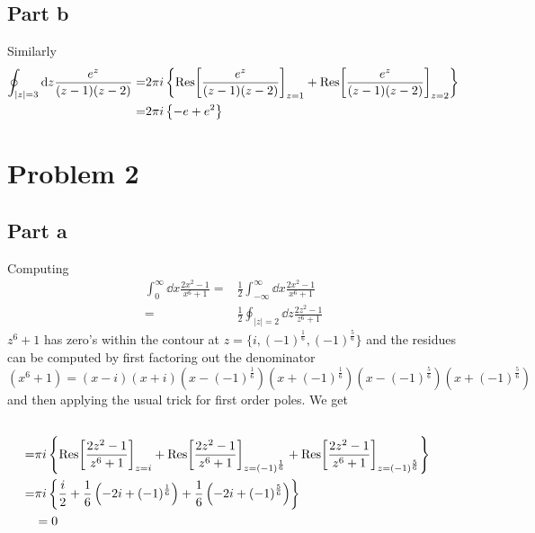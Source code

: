 \documentclass[a4paper,12pt]{article}
\begin{document}
\subsection*{Part b}
Similarly
\begin{equation}
	\begin{aligned}
		\oint_{|z|=3} \dd z\frac{e^z}{(z-1)(z-2)}=&2\pi i \left\{\Res[\frac{e^z}{(z-1)(z-2)}]_{z=1}+\Res[\frac{e^z}{(z-1)(z-2)}]_{z=2}\right\}\\
		=&2\pi i \left\{-e+e^2\right\}\\
	\end{aligned}
\end{equation}
\section*{Problem 2}
\subsection*{Part a}
Computing
\begin{equation}
	\begin{aligned}
		\int_{0}^{\infty}\dd x\frac{2x^2-1}{x^6+1}
		=&	\frac{1}{2}\int_{-\infty}^{\infty}\dd x\frac{2x^2-1}{x^6+1}
		\\
		=&\frac{1}{2}\oint_{|z|=2} \dd z\frac{2z^2-1}{z^6+1}
	\end{aligned}
\end{equation}
$z^6+1$ has zero's within the contour at $z=\{i,(-1)^{\frac{1}{6}},(-1)^{\frac{5}{6}}\}$ and the residues can be computed by first factoring out the denominator 
\begin{equation}
(x^6+1)=(x-i)(x+i)\left(x-(-1)^{\frac{1}{6}}\right)\left(x+(-1)^{\frac{1}{6}}\right)\left(x-(-1)^{\frac{5}{6}}\right)\left(x+(-1)^{\frac{5}{6}}\right)
\end{equation}
and then applying the usual trick for first order poles. We get
\begin{equation}
\begin{aligned}
		\\
		=&\pi i
		 \left\{\Res[\frac{2z^2-1}{z^6+1}]_{z=i}+\Res[\frac{2z^2-1}{z^6+1}]_{z=(-1)^{\frac{1}{6}}}+\Res[\frac{2z^2-1}{z^6+1}]_{z=(-1)^{\frac{5}{6}}}\right\}\\
		=&\pi i \left\{\frac{i}{2}+\frac{1}{6}\left(-2i+(-1)^{\frac{1}{6}}\right)+\frac{1}{6}\left(-2i+(-1)^{\frac{5}{6}}\right)\right\}\\
		&=0
	\end{aligned}
\end{equation}
\end{document}
